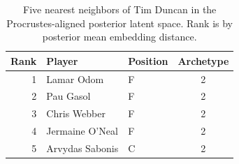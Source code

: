 \begin{table}[htbp]
  \centering\small
  \begin{tabular}{rllc}
    \toprule
    Rank & Player & Position & Archetype \\
    \midrule
    1 & Lamar Odom & F & 2 \\
    2 & Pau Gasol & F & 2 \\
    3 & Chris Webber & F & 2 \\
    4 & Jermaine O'Neal & F & 2 \\
    5 & Arvydas Sabonis & C & 2 \\
    \bottomrule
  \end{tabular}
  \caption{Five nearest neighbors of Tim Duncan in the Procrustes-aligned posterior latent space. Rank is by posterior mean embedding distance.}
  \label{tab:Tim_Duncan_neighbors}
\end{table}

